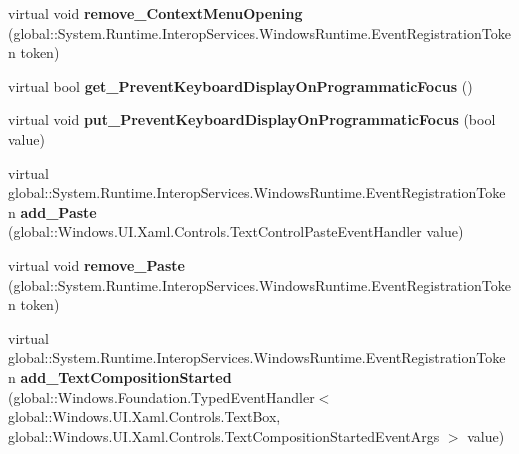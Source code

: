\begin{DoxyCompactItemize}
\mbox{\label{class_windows_1_1_u_i_1_1_xaml_1_1_controls_1_1_text_box_ad3a3c299db3a774e1db87983c4ee1b5c}} 
virtual void {\bfseries remove\+\_\+\+Context\+Menu\+Opening} (global\+::\+System.\+Runtime.\+Interop\+Services.\+Windows\+Runtime.\+Event\+Registration\+Token token)
\item 
\mbox{\label{class_windows_1_1_u_i_1_1_xaml_1_1_controls_1_1_text_box_ab8c87aab30bc9eb47b16617cd979f283}} 
virtual bool {\bfseries get\+\_\+\+Prevent\+Keyboard\+Display\+On\+Programmatic\+Focus} ()
\item 
\mbox{\label{class_windows_1_1_u_i_1_1_xaml_1_1_controls_1_1_text_box_aeb5452275c88b059cb6fcab37f2c0547}} 
virtual void {\bfseries put\+\_\+\+Prevent\+Keyboard\+Display\+On\+Programmatic\+Focus} (bool value)
\item 
\mbox{\label{class_windows_1_1_u_i_1_1_xaml_1_1_controls_1_1_text_box_a228a83caf2e3f6ac77d710ba279dfb6e}} 
virtual global\+::\+System.\+Runtime.\+Interop\+Services.\+Windows\+Runtime.\+Event\+Registration\+Token {\bfseries add\+\_\+\+Paste} (global\+::\+Windows.\+U\+I.\+Xaml.\+Controls.\+Text\+Control\+Paste\+Event\+Handler value)
\item 
\mbox{\label{class_windows_1_1_u_i_1_1_xaml_1_1_controls_1_1_text_box_affd66f6fbd07759509d7f75dab0e7186}} 
virtual void {\bfseries remove\+\_\+\+Paste} (global\+::\+System.\+Runtime.\+Interop\+Services.\+Windows\+Runtime.\+Event\+Registration\+Token token)
\item 
\mbox{\label{class_windows_1_1_u_i_1_1_xaml_1_1_controls_1_1_text_box_a7ee5e64932c7b9974d38444e13822e2c}} 
virtual global\+::\+System.\+Runtime.\+Interop\+Services.\+Windows\+Runtime.\+Event\+Registration\+Token {\bfseries add\+\_\+\+Text\+Composition\+Started} (global\+::\+Windows.\+Foundation.\+Typed\+Event\+Handler$<$ global\+::\+Windows.\+U\+I.\+Xaml.\+Controls.\+Text\+Box, global\+::\+Windows.\+U\+I.\+Xaml.\+Controls.\+Text\+Composition\+Started\+Event\+Args $>$ value)

\end{DoxyCompactItemize}
